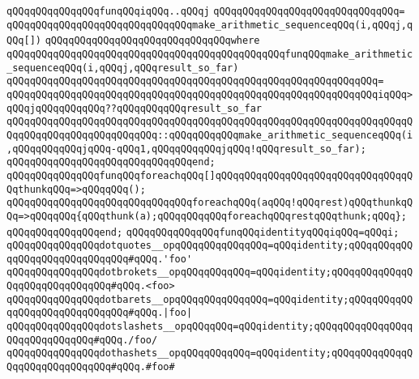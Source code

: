 \verb|qQQqqQQqqQQqqQQqfunqQQqiqQQq..qQQqj|\newline
\verb|qQQqqQQqqQQqqQQqqQQqqQQqqQQqqQQq=|\newline
\verb|qQQqqQQqqQQqqQQqqQQqqQQqqQQqqQQqmake_arithmetic_sequenceqQQq(i,qQQqj,qQQq[])|\newline
\verb|qQQqqQQqqQQqqQQqqQQqqQQqqQQqqQQqwhere|\newline
\verb|qQQqqQQqqQQqqQQqqQQqqQQqqQQqqQQqqQQqqQQqqQQqqQQqfunqQQqmake_arithmetic_sequenceqQQq(i,qQQqj,qQQqresult_so_far)|\newline
\verb|qQQqqQQqqQQqqQQqqQQqqQQqqQQqqQQqqQQqqQQqqQQqqQQqqQQqqQQqqQQqqQQq=|\newline
\verb|qQQqqQQqqQQqqQQqqQQqqQQqqQQqqQQqqQQqqQQqqQQqqQQqqQQqqQQqqQQqqQQqiqQQq>qQQqjqQQqqQQqqQQq??qQQqqQQqqQQqresult_so_far|\newline
\verb|qQQqqQQqqQQqqQQqqQQqqQQqqQQqqQQqqQQqqQQqqQQqqQQqqQQqqQQqqQQqqQQqqQQqqQQqqQQqqQQqqQQqqQQqqQQqqQQq::qQQqqQQqqQQqmake_arithmetic_sequenceqQQq(i,qQQqqQQqqQQqjqQQq-qQQq1,qQQqqQQqqQQqjqQQq!qQQqresult_so_far);|\newline
\verb|qQQqqQQqqQQqqQQqqQQqqQQqqQQqqQQqend;|\newline
\newline
\newline
\verb|qQQqqQQqqQQqqQQqfunqQQqforeachqQQq[]qQQqqQQqqQQqqQQqqQQqqQQqqQQqqQQqqQQqthunkqQQq=>qQQqqQQq();|\newline
\verb|qQQqqQQqqQQqqQQqqQQqqQQqqQQqqQQqforeachqQQq(aqQQq!qQQqrest)qQQqthunkqQQq=>qQQqqQQq{qQQqthunk(a);qQQqqQQqqQQqforeachqQQqrestqQQqthunk;qQQq};|\newline
\verb|qQQqqQQqqQQqqQQqend;|\newline
\newline
\verb|qQQqqQQqqQQqqQQqfunqQQqidentityqQQqiqQQq=qQQqi;|\newline
\newline
\verb|qQQqqQQqqQQqqQQqdotquotes__opqQQqqQQqqQQqqQQq=qQQqidentity;qQQqqQQqqQQqqQQqqQQqqQQqqQQqqQQq#qQQq.'foo'|\newline
\verb|qQQqqQQqqQQqqQQqdotbrokets__opqQQqqQQqqQQq=qQQqidentity;qQQqqQQqqQQqqQQqqQQqqQQqqQQqqQQq#qQQq.<foo>|\newline
\verb|qQQqqQQqqQQqqQQqdotbarets__opqQQqqQQqqQQqqQQq=qQQqidentity;qQQqqQQqqQQqqQQqqQQqqQQqqQQqqQQq#qQQq.|\verb#|foo|#\newline
\verb|qQQqqQQqqQQqqQQqdotslashets__opqQQqqQQq=qQQqidentity;qQQqqQQqqQQqqQQqqQQqqQQqqQQqqQQq#qQQq./foo/|\newline
\verb|qQQqqQQqqQQqqQQqdothashets__opqQQqqQQqqQQq=qQQqidentity;qQQqqQQqqQQqqQQqqQQqqQQqqQQqqQQq#qQQq.#foo#|\newline
